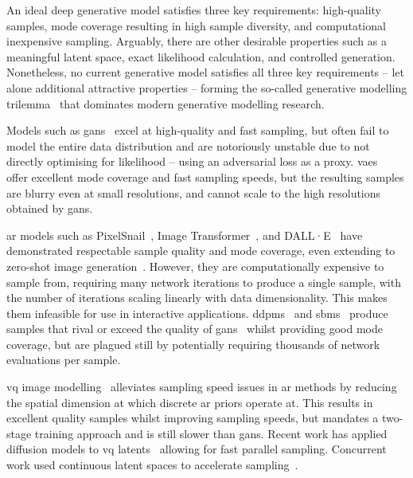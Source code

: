 An ideal deep generative model satisfies three key requirements: high-quality
samples, mode coverage resulting in high sample diversity, and computational
inexpensive sampling. Arguably, there are other desirable properties such as a
meaningful latent space, exact likelihood calculation, and controlled
generation. Nonetheless, no current generative model satisfies all three key
requirements -- let alone additional attractive properties -- forming the
so-called generative modelling trilemma~\cite{xiao2021trilemma} that dominates
modern generative modelling research.

Models such as \glspl{gan}~\cite{goodfellow2014gan} excel at high-quality and
fast sampling, but often fail to model the entire data distribution and are
notoriously unstable due to not directly optimising for likelihood -- using an
adversarial loss as a proxy. \Glspl{vae}~\cite{kingma2013vae} offer excellent
mode coverage and fast sampling speeds, but the resulting samples are blurry
even at small resolutions, and cannot scale to the high resolutions obtained by
\glspl{gan}.

\Gls{ar} models such as PixelSnail~\cite{chen2017snail}, Image
Transformer~\cite{parmar2018image}, and DALL·E~\cite{parmar2018image} have
demonstrated respectable sample quality and mode coverage, even extending to
zero-shot image generation~\cite{ramesh2021dalle}. However, they are
computationally expensive to sample from, requiring many network iterations to
produce a single sample, with the number of iterations scaling linearly with
data dimensionality. This makes them infeasible for use in interactive
applications. \Glspl{ddpm}~\cite{ho2020ddpm} and
\glspl{sbm}~\cite{song2019sbm,song2020sde,song2021mlt} produce samples that
rival or exceed the quality of \glspl{gan}~\cite{dhariwal2021ddpm} whilst
providing good mode coverage, but are plagued still by potentially requiring
thousands of network evaluations per sample.

\Gls{vq} image
modelling~\cite{oord2017vqvae,razavi2019generating,esser2021taming} alleviates
sampling speed issues in \gls{ar} methods by reducing the spatial dimension at
which discrete \gls{ar} priors operate at. This results in excellent quality
samples whilst improving sampling speeds, but mandates a two-stage training
approach and is still slower than \glspl{gan}. Recent work has
applied diffusion models to \gls{vq} latents~\cite{bondtaylor2021unleashing}
allowing for fast parallel sampling. Concurrent work used continuous latent
spaces to accelerate sampling~\cite{xiao2021trilemma,vahdat2021sbmlatent}.

